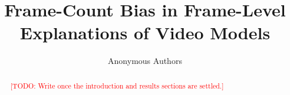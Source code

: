 \documentclass[10pt]{article} %
\title{Frame-Count Bias in Frame-Level Explanations of Video Models}
\author{\name Anonymous Authors}
\newcommand{\todo}[1]{\textcolor{red}{[TODO: #1]}}
\begin{document}
\maketitle

\begin{abstract}
\todo{Write once the introduction and results sections are settled.}
\end{abstract}










\appendix

\end{document}
